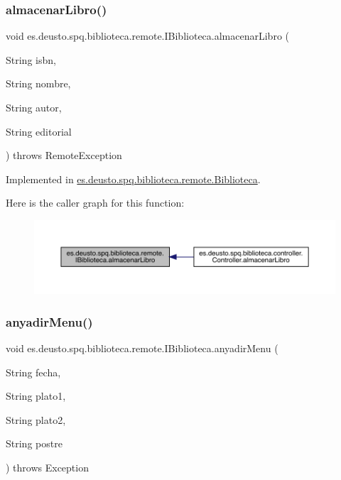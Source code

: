 \subsubsection{\texorpdfstring{almacenar\+Libro()}{almacenarLibro()}}
{\footnotesize\ttfamily void es.\+deusto.\+spq.\+biblioteca.\+remote.\+I\+Biblioteca.\+almacenar\+Libro (\begin{DoxyParamCaption}\item[{String}]{isbn,  }\item[{String}]{nombre,  }\item[{String}]{autor,  }\item[{String}]{editorial }\end{DoxyParamCaption}) throws Remote\+Exception}



Implemented in \mbox{\hyperlink{classes_1_1deusto_1_1spq_1_1biblioteca_1_1remote_1_1_biblioteca_ae6389acf6f1cab24aa1bb55b38c010b0}{es.\+deusto.\+spq.\+biblioteca.\+remote.\+Biblioteca}}.

Here is the caller graph for this function\+:
\nopagebreak
\begin{figure}[H]
\begin{center}
\leavevmode
\includegraphics[width=350pt]{interfacees_1_1deusto_1_1spq_1_1biblioteca_1_1remote_1_1_i_biblioteca_a680527b39d6011fe354b9410a204e8cc_icgraph}
\end{center}
\end{figure}
\mbox{\label{interfacees_1_1deusto_1_1spq_1_1biblioteca_1_1remote_1_1_i_biblioteca_a07c2558d19f41b795d00a7fd91783fb5}} 
\subsubsection{\texorpdfstring{anyadir\+Menu()}{anyadirMenu()}}
{\footnotesize\ttfamily void es.\+deusto.\+spq.\+biblioteca.\+remote.\+I\+Biblioteca.\+anyadir\+Menu (\begin{DoxyParamCaption}\item[{String}]{fecha,  }\item[{String}]{plato1,  }\item[{String}]{plato2,  }\item[{String}]{postre }\end{DoxyParamCaption}) throws Exception}




